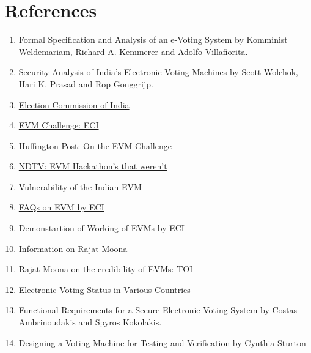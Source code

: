 \documentclass[a4paper,12pt]{extarticle}
\begin{document}
\section{References}
\begin{enumerate}
\item Formal Specification and Analysis of an e-Voting System by Komminist Weldemariam, Richard A. Kemmerer and Adolfo Villafiorita.
\item Security Analysis of India’s Electronic Voting Machines by Scott Wolchok, Hari K. Prasad and Rop Gonggrijp.
\item \href{http://eci.nic.in/eci/eci.html}{Election Commission of India}
\item \href{http://eci.nic.in/eci_main1/current/ChallengeEVM20052017.pdf}{EVM Challenge: ECI}
\item \href{https://www.huffingtonpost.in/ankit-lal/dear-election-commission-here-s-why-your-evm-hackathon-is-a-j_a_22108571/}{Huffington Post: On the EVM Challenge}
\item \href{https://www.ndtv.com/india-news/election-commission-evm-challenge-today-aap-hackathon-too-10-points-1707370}{NDTV: EVM Hackathon's that weren't}
\item \href{https://indiaevm.org}{Vulnerability of the Indian EVM}
\item \href{http://eci.nic.in/eci_main1/evm.aspx}{FAQs on EVM by ECI}
\item \href{http://eci.nic.in/eci_main1/evm1.aspx}{Demonstartion of Working of EVMs by ECI}
\item \href{https://www.iitbhilai.ac.in/index.php?pid=admin_messagefromdirector}{Information on Rajat Moona}
\item \href{https://blogs.timesofindia.indiatimes.com/toi-edit-page/evms-do-stellar-service-as-messengers-of-the-peoples-mandate-and-every-winning-candidate-loves-them/}{Rajat Moona on the credibility of EVMs: TOI}
\item \href{https://en.wikipedia.org/wiki/Electronic_voting_by_country}{Electronic Voting Status in Various Countries}
\item Functional Requirements for a Secure Electronic Voting System by Costas Ambrinoudakis and Spyros Kokolakis.
\item Designing a Voting Machine for Testing and Verification by Cynthia Sturton
\end{enumerate}
\end{document}
